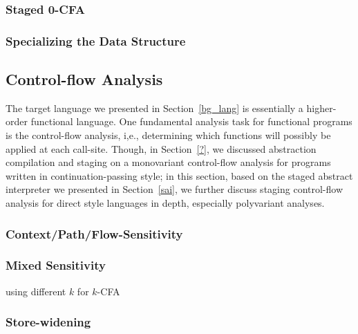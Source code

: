 \subsubsection{Staged 0-CFA}

\subsubsection{Specializing the Data Structure}


\subsection{Control-flow Analysis} \label{cfa}

The target language we presented in Section~\ref{bg_lang} is essentially a higher-order functional language.
One fundamental analysis task for functional programs is the control-flow analysis, i,e., determining
which functions will possibly be applied at each call-site. 
Though, in Section~\ref{?}, we discussed abstraction compilation and staging on a monovariant 
control-flow analysis for programs written in continuation-passing style; 
in this section, based on the staged abstract interpreter we presented in Section~\ref{sai}, 
we further discuss staging control-flow analysis for direct style languages in depth, 
especially polyvariant analyses.

\subsubsection{Context/Path/Flow-Sensitivity}

\subsubsection{Mixed Sensitivity}

using different $k$ for $k$-CFA

\subsubsection{Store-widening}


